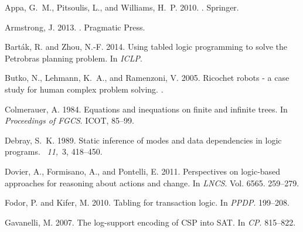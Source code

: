 \documentclass{new_tlp}
\begin{document}
\begin{thebibliography}{}

{\sc Appa, G.~M.}, {\sc Pitsoulis, L.}, {\sc and} {\sc Williams, H.~P.} 2010.
.
\newblock Springer.

{\sc Armstrong, J.} 2013.
.
\newblock Pragmatic Press.

{\sc Bart{\'a}k, R.} {\sc and} {\sc Zhou, N.-F.} 2014.
\newblock Using tabled logic programming to solve the {Petrobras} planning
  problem.
\newblock In {\em ICLP}.

{\sc Butko, N.}, {\sc Lehmann, K.~A.}, {\sc and} {\sc Ramenzoni, V.} 2005.
\newblock Ricochet robots - a case study for human complex problem solving.
.

{\sc Colmerauer, A.} 1984.
\newblock Equations and inequations on finite and infinite trees.
\newblock In {\em {Proceedings of FGCS}}. ICOT, 85--99.

{\sc Debray, S.~K.} 1989.
\newblock Static inference of modes and data dependencies in logic programs.
~{\em 11,\/}~3, 418--450.

{\sc Dovier, A.}, {\sc Formisano, A.}, {\sc and} {\sc Pontelli, E.} 2011.
\newblock Perspectives on logic-based approaches for reasoning about actions
  and change.
\newblock In {\em LNCS}. Vol. 6565. 259--279.

{\sc Fodor, P.} {\sc and} {\sc Kifer, M.} 2010.
\newblock Tabling for transaction logic.
\newblock In {\em PPDP}. 199--208.

{\sc Gavanelli, M.} 2007.
\newblock The log-support encoding of {CSP} into {SAT}.
\newblock In {\em CP}. 815--822.


\end{thebibliography}
\end{document}
